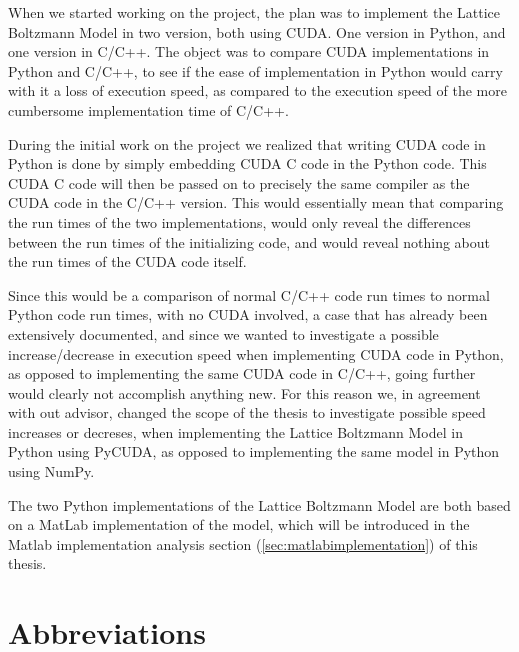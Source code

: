 When we started working on the project, the plan was to implement the Lattice Boltzmann Model in two version, both using CUDA. One version in Python, and one version in C/C++. The object was to compare CUDA implementations in Python and C/C++, to see if the ease of implementation in Python would carry with it a loss of execution speed, as compared to the execution speed of the more cumbersome implementation time of C/C++.

During the initial work on the project we realized that writing CUDA code in Python is done by simply embedding CUDA C code in the Python code. This CUDA C code will then be passed on to precisely the same compiler as the CUDA code in the C/C++ version. This would essentially mean that comparing the run times of the two implementations, would only reveal the differences between the run times of the initializing code, and would reveal nothing about the run times of the CUDA code itself.

Since this would be a comparison of normal C/C++ code run times to normal Python code run times, with no CUDA involved, a case that has already been extensively documented, and since we wanted to investigate a possible increase/decrease in execution speed when implementing CUDA code in Python, as opposed to implementing the same CUDA code in C/C++, going further would clearly not accomplish anything new. For this reason we, in agreement with out advisor, changed the scope of the thesis to investigate possible speed increases or decreses, when implementing the Lattice Boltzmann Model in Python using PyCUDA, as opposed to implementing the same model in Python using NumPy.

The two Python implementations of the Lattice Boltzmann Model are both based on a MatLab implementation of the model, which will be introduced in the Matlab implementation analysis section (\autoref{sec:matlabimplementation}) of this thesis.

\newpage

\section{Abbreviations}

